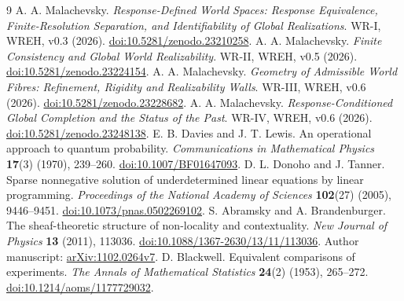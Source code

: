 \begingroup\raggedright
\begin{thebibliography}{9}
 A. A. Malachevsky. \emph{Response-Defined World Spaces: Response Equivalence, Finite-Resolution Separation, and Identifiability of Global Realizations}. WR-I, WREH, v0.3 (2026). \href{https://doi.org/10.5281/zenodo.23210258}{doi:10.5281/zenodo.23210258}.
 A. A. Malachevsky. \emph{Finite Consistency and Global World Realizability}. WR-II, WREH, v0.5 (2026). \href{https://doi.org/10.5281/zenodo.23224154}{doi:10.5281/zenodo.23224154}.
 A. A. Malachevsky. \emph{Geometry of Admissible World Fibres: Refinement, Rigidity and Realizability Walls}. WR-III, WREH, v0.6 (2026). \href{https://doi.org/10.5281/zenodo.23228682}{doi:10.5281/zenodo.23228682}.
 A. A. Malachevsky. \emph{Response-Conditioned Global Completion and the Status of the Past}. WR-IV, WREH, v0.6 (2026). \href{https://doi.org/10.5281/zenodo.23248138}{doi:10.5281/zenodo.23248138}.
 E. B. Davies and J. T. Lewis. An operational approach to quantum probability. \emph{Communications in Mathematical Physics} \textbf{17}(3) (1970), 239--260. \href{https://doi.org/10.1007/BF01647093}{doi:10.1007/BF01647093}.
 D. L. Donoho and J. Tanner. Sparse nonnegative solution of underdetermined linear equations by linear programming. \emph{Proceedings of the National Academy of Sciences} \textbf{102}(27) (2005), 9446--9451. \href{https://doi.org/10.1073/pnas.0502269102}{doi:10.1073/pnas.0502269102}.
 S. Abramsky and A. Brandenburger. The sheaf-theoretic structure of non-locality and contextuality. \emph{New Journal of Physics} \textbf{13} (2011), 113036. \href{https://doi.org/10.1088/1367-2630/13/11/113036}{doi:10.1088/1367-2630/13/11/113036}. Author manuscript: \href{https://arxiv.org/abs/1102.0264v7}{arXiv:1102.0264v7}.
 D. Blackwell. Equivalent comparisons of experiments. \emph{The Annals of Mathematical Statistics} \textbf{24}(2) (1953), 265--272. \href{https://doi.org/10.1214/aoms/1177729032}{doi:10.1214/aoms/1177729032}.
\end{thebibliography}
\endgroup
